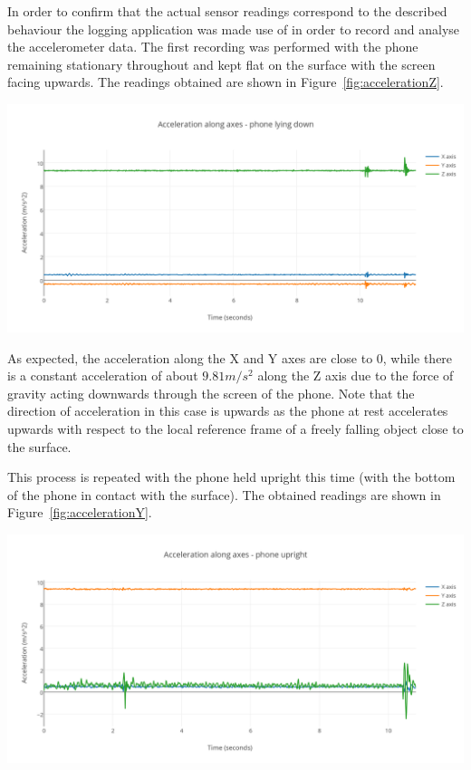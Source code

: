 \documentclass[12pt,a4paper,notitlepage]{report}
\begin{document}
In order to confirm that the actual sensor readings correspond to the described behaviour the logging application was made use of in order to record and analyse the accelerometer data. The first recording was performed with the phone remaining stationary throughout and kept flat on the surface with the screen facing upwards. The readings obtained are shown in Figure~\ref{fig:accelerationZ}.

\begin{center}
\includegraphics[scale=0.9]{images/accelerationZ.png}
\label{fig:accelerationZ}
\end{center}

As expected, the acceleration along the X and Y axes are close to 0, while there is a constant acceleration of about $9.81 m/s^2$ along the Z axis due to the force of gravity acting downwards through the screen of the phone. Note that the direction of acceleration in this case is upwards as the phone at rest accelerates upwards with respect to the local reference frame of a freely falling object close to the surface. 

This process is repeated with the phone held upright this time (with the bottom of the phone in contact with the surface). The obtained readings are shown in Figure~\ref{fig:accelerationY}.

\begin{center}
\includegraphics[scale=0.9]{images/accelerationY.png}
\label{fig:accelerationY}
\end{center}
\end{document}

